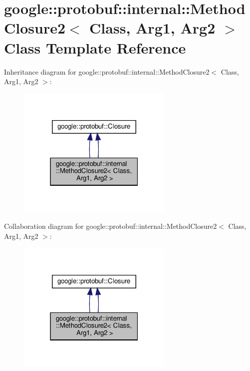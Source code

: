 \hypertarget{classgoogle_1_1protobuf_1_1internal_1_1MethodClosure2}{}\section{google\+:\+:protobuf\+:\+:internal\+:\+:Method\+Closure2$<$ Class, Arg1, Arg2 $>$ Class Template Reference}
\label{classgoogle_1_1protobuf_1_1internal_1_1MethodClosure2}


Inheritance diagram for google\+:\+:protobuf\+:\+:internal\+:\+:Method\+Closure2$<$ Class, Arg1, Arg2 $>$\+:
\nopagebreak
\begin{figure}[H]
\begin{center}
\leavevmode
\includegraphics[width=211pt]{classgoogle_1_1protobuf_1_1internal_1_1MethodClosure2__inherit__graph}
\end{center}
\end{figure}


Collaboration diagram for google\+:\+:protobuf\+:\+:internal\+:\+:Method\+Closure2$<$ Class, Arg1, Arg2 $>$\+:
\nopagebreak
\begin{figure}[H]
\begin{center}
\leavevmode
\includegraphics[width=211pt]{classgoogle_1_1protobuf_1_1internal_1_1MethodClosure2__coll__graph}
\end{center}
\end{figure}
